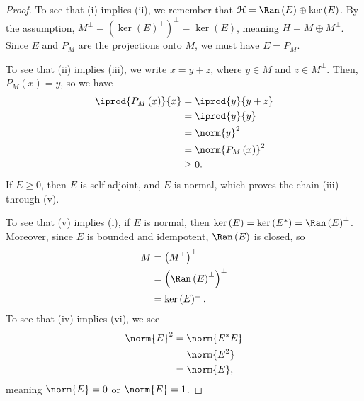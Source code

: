 \documentclass[10pt]{mypackage}
\begin{document}
\begin{proof}
  To see that (i) implies (ii), we remember that $\mathcal{H} = \Ran\left(E\right) \oplus \ker\left(E\right)$. By the assumption, $M^{\perp} = \left(\ker\left(E\right)^{\perp}\right)^{\perp} = \ker\left(E\right)$, meaning $H = M\oplus M^{\perp}$. Since $E$ and $P_M$ are the projections onto $M$, we must have $E = P_M$.\newline

  To see that (ii) implies (iii), we write $x = y + z$, where $y\in M$ and $z\in M^{\perp}$. Then, $P_M(x) = y$, so we have
  \begin{align*}
    \iprod{P_M\left(x\right)}{x} &= \iprod{y}{y+z}\\
                                 &= \iprod{y}{y}\\
                                 &= \norm{y}^2\\
                                 &= \norm{P_M\left(x\right)}^2\\
                                 &\geq 0.
  \end{align*}
  If $E \geq 0$, then $E$ is self-adjoint, and $E$ is normal, which proves the chain (iii) through (v).\newline

  To see that (v) implies (i), if $E$ is normal, then $\ker\left(E\right) = \ker\left(E^{\ast}\right) = \Ran\left(E\right)^{\perp}$. Moreover, since $E$ is bounded and idempotent, $\Ran\left(E\right)$ is closed, so
  \begin{align*}
    M &= \left(M^{\perp}\right)^{\perp}\\
      &= \left(\Ran\left(E\right)^{\perp}\right)^{\perp}\\
      &= \ker\left(E\right)^{\perp}.
  \end{align*}
  To see that (iv) implies (vi), we see
  \begin{align*}
    \norm{E}^2 &= \norm{E^{\ast}E}\\
               &= \norm{E^2}\\
               &= \norm{E},
  \end{align*}
  meaning $\norm{E} = 0$ or $\norm{E} = 1$.\newline


\end{proof}
\end{document}
